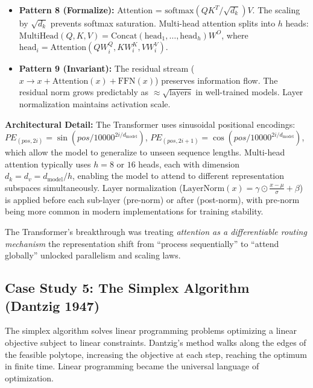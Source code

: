 \begin{itemize}
\item \textbf{Pattern 8 (Formalize):} Attention = $\text{softmax}(QK^T/\sqrt{d_k})V$. The scaling by $\sqrt{d_k}$ prevents softmax saturation. Multi-head attention splits into $h$ heads: $\text{MultiHead}(Q, K, V) = \text{Concat}(\text{head}_1, \dots, \text{head}_h)W^O$, where $\text{head}_i = \text{Attention}(QW_i^Q, KW_i^K, VW_i^V)$.

\item \textbf{Pattern 9 (Invariant):} The residual stream ($x \to x + \text{Attention}(x) + \text{FFN}(x)$) preserves information flow. The residual norm grows predictably as $\approx \sqrt{\text{layers}}$ in well-trained models. Layer normalization maintains activation scale.
\end{itemize}

\textbf{Architectural Detail:} The Transformer uses sinusoidal positional encodings: $PE_{(pos,2i)} = \sin(pos/10000^{2i/d_{\text{model}}})$, $PE_{(pos,2i+1)} = \cos(pos/10000^{2i/d_{\text{model}}})$, which allow the model to generalize to unseen sequence lengths. Multi-head attention typically uses $h = 8$ or $16$ heads, each with dimension $d_k = d_v = d_{\text{model}}/h$, enabling the model to attend to different representation subspaces simultaneously. Layer normalization ($\text{LayerNorm}(x) = \gamma \odot \frac{x - \mu}{\sigma} + \beta$) is applied before each sub-layer (pre-norm) or after (post-norm), with pre-norm being more common in modern implementations for training stability.

The Transformer's breakthrough was treating \emph{attention as a differentiable routing mechanism} the representation shift from ``process sequentially'' to ``attend globally'' unlocked parallelism and scaling laws.

\subsection{Case Study 5: The Simplex Algorithm (Dantzig 1947)}

The simplex algorithm solves linear programming problems optimizing a linear objective subject to linear constraints. Dantzig's method walks along the edges of the feasible polytope, increasing the objective at each step, reaching the optimum in finite time. Linear programming became the universal language of optimization.

